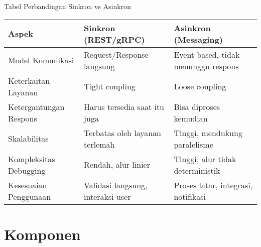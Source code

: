\documentclass[aspectratio=169, table]{beamer}
\begin{document}
\begin{frame}[fragile]{Tabel Perbandingan Sinkron vs Asinkron}
	\vspace{20pt}
	\scriptsize
	\setlength{\arrayrulewidth}{0.4pt} %
	\begin{table}[H]
		\centering
		\renewcommand{\arraystretch}{1.3}
		\begin{tabular}{|p{}|p{}|p{}|}
			\rowcolor{gray!25}
			\hline
			\textbf{Aspek} & \textbf{Sinkron (REST/gRPC)} & \textbf{Asinkron (Messaging)} \\
			\hline
			Model Komunikasi & Request/Response langsung & Event-based, tidak menunggu respons \\
			\hline
			Keterkaitan Layanan & Tight coupling & Loose coupling \\
			\hline
			Ketergantungan Respons & Harus tersedia saat itu juga & Bisa diproses kemudian \\
			\hline
			Skalabilitas & Terbatas oleh layanan terlemah & Tinggi, mendukung paralelisme \\
			\hline
			Kompleksitas Debugging & Rendah, alur linier & Tinggi, alur tidak deterministik \\
			\hline
			Kesesuaian Penggunaan & Validasi langsung, interaksi user & Proses latar, integrasi, notifikasi \\
			\hline
		\end{tabular}
	\end{table}
\end{frame}



\section{Komponen}
\end{document}
